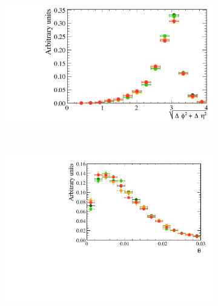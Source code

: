\begin{figure}
    \centering
    \begin{subfigure}[b]{0.48\textwidth}
        \includegraphics[trim={12cm 0 0 0},clip,width=\textwidth]{./Figs/Appendix1/bkgnd_DeltaR.pdf}
    \end{subfigure}
    ~ %
    \begin{subfigure}[b]{0.48\textwidth}
       \includegraphics[width=\textwidth]{./Figs/Appendix1/bkgnd_DIRA.pdf}
    \end{subfigure}




\end{figure}
